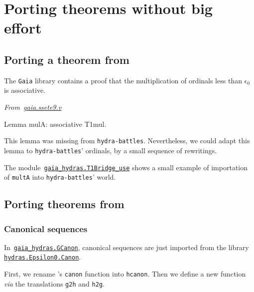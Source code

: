

\section{Porting theorems without big effort}


\subsection{Porting a theorem from \gaia}
The \texttt{Gaia} library contains a proof that the multiplication of ordinals less than $\epsilon_0$ is associative.

\emph{From~\href{https://github.com/coq-community/gaia/blob/master/theories/ssete9.v}{gaia.ssete9.v}}

\begin{Coqsrc}
Lemma mulA: associative T1mul.
\end{Coqsrc}

This lemma was missing from \texttt{hydra-battles}. Nevertheless, we could adapt this lemma to \texttt{hydra-battles}' ordinals, by a small sequence of rewritings.


The module~\href{../theories/html/gaia_hydras.T1Bridge_use.html}%
{\texttt{gaia\_hydras.T1Bridge\_use}} shows a small
example of importation of \texttt{multA} into \texttt{hydra-battles}' world.


\subsection{Porting theorems from \Hydras}

\subsubsection{Canonical sequences}


In~\href{../theories/html/gaia_hydras.GCanon.html}%
{\texttt{gaia\_hydras.GCanon}}, canonical sequences are just imported from the library \linebreak
\href{../theories/html/hydras.Epsilon0.Canon.html}%
{\texttt{hydras.Epsilon0.Canon}}.

First, we rename \Hydras's \texttt{canon} function into
\texttt{hcanon}. Then we define a new function \emph{via} the
translations \texttt{g2h} and \texttt{h2g}.

